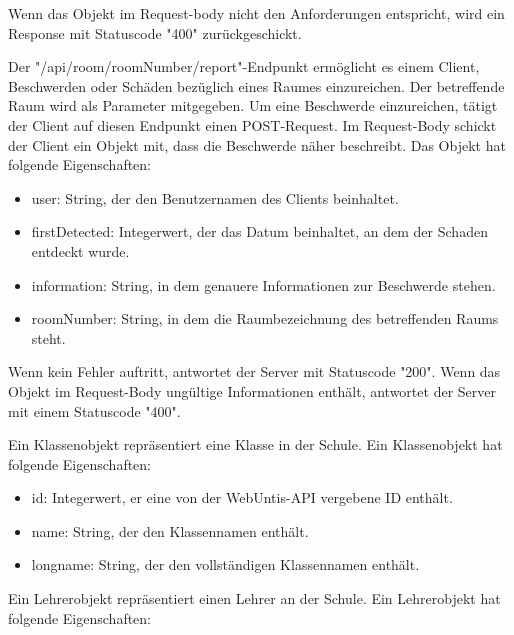 Wenn das Objekt im Request-body nicht den Anforderungen entspricht, wird ein Response mit Statuscode "400" zurückgeschickt. 


Der "/api/room/{roomNumber}/report"-Endpunkt ermöglicht es einem Client, Beschwerden oder Schäden bezüglich eines Raumes einzureichen. Der betreffende Raum wird als Parameter mitgegeben. Um eine Beschwerde einzureichen, tätigt der Client auf diesen Endpunkt einen POST-Request. Im Request-Body schickt der Client ein Objekt mit, dass die Beschwerde näher beschreibt. Das Objekt hat folgende Eigenschaften:

\begin{itemize}
    \item user: String, der den Benutzernamen des Clients beinhaltet.
    \item firstDetected: Integerwert, der das Datum beinhaltet, an dem der Schaden entdeckt wurde. 
    \item information: String, in dem genauere Informationen zur Beschwerde stehen. 
    \item roomNumber: String, in dem die Raumbezeichnung des betreffenden Raums steht. 
\end{itemize}

Wenn kein Fehler auftritt, antwortet der Server mit Statuscode "200". Wenn das Objekt im Request-Body ungültige Informationen enthält, antwortet der Server mit einem Statuscode "400".


Ein Klassenobjekt repräsentiert eine Klasse in der Schule. Ein Klassenobjekt hat folgende Eigenschaften: 

\begin{itemize}
    \item id: Integerwert, er eine von der WebUntis-API vergebene ID enthält. 
    \item name: String, der den Klassennamen enthält. 
    \item longname: String, der den vollständigen Klassennamen enthält. 
\end{itemize}


Ein Lehrerobjekt repräsentiert einen Lehrer an der Schule. Ein Lehrerobjekt hat folgende Eigenschaften: 

